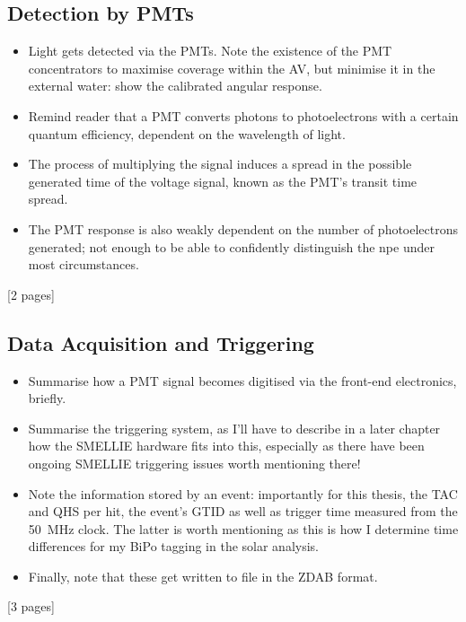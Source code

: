     \subsection{Detection by PMTs}\label{sec:pmts}
{
    \color{blue}
    \begin{itemize}
        \item Light gets detected via the PMTs. Note the existence of the PMT concentrators to maximise coverage within the AV, but minimise it in the external water: show the calibrated angular response.
        \item Remind reader that a PMT converts photons to photoelectrons with a certain quantum efficiency, dependent on the wavelength of light.
        \item The process of multiplying the signal induces a spread in the possible generated time of the voltage signal, known as the PMT's transit time spread.
        \item The PMT response is also weakly dependent on the number of photoelectrons generated; not enough to be able to confidently distinguish the npe under most circumstances.
    \end{itemize}
    [2 pages]
    \subsection{Data Acquisition and Triggering}
    \begin{itemize}
        \item Summarise how a PMT signal becomes digitised via the front-end electronics, briefly.
        \item Summarise the triggering system, as I'll have to describe in a later chapter how the SMELLIE hardware fits into this, especially as there have been ongoing SMELLIE triggering issues worth mentioning there!
        \item Note the information stored by an event: importantly for this thesis, the TAC and QHS per hit, the event's GTID as well as trigger time measured from the \SI{50}{\mega\Hz} clock. The latter is worth mentioning as this is how I determine time differences for my BiPo tagging in the solar analysis.
        \item Finally, note that these get written to file in the ZDAB format.
    \end{itemize}
    [3 pages]
}
